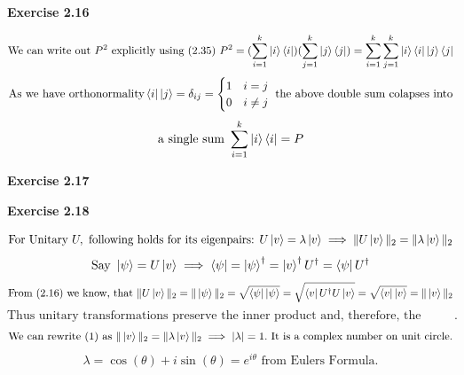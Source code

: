\documentclass{article}
\begin{document}
\bigskip

\begin{framed}
    \noindent \textbf{Exercise 2.16}
    
    \medskip
    $$
    \text{We can write out } P^2 \text{ explicitly using (2.35) } P^{2} = (\sum_{i=1}^{k}{\ket{i}\bra{i}})(\sum_{j=1}^{k}{\ket{j}\bra{j}}) = \sum_{i=1}^{k}\sum_{j=1}^{k}\ket{i}\bra{i}\ket{j}\bra{j}
    $$
    $$
    \text{As we have orthonormality} \bra{i}\ket{j} = \delta_{ij} = \begin{cases}1 & i=j \\ 0 & i \neq j\end{cases} \text{ the above double sum colapses into}
    $$
    $$
    \text{a single sum }\sum_{i=1}^{k}{\ket{i}\bra{i}} = P
    $$
    
    
\end{framed}

\bigskip

\begin{framed}
    \noindent \textbf{Exercise 2.17}
    
    \medskip
    
    
\end{framed}

\bigskip

\begin{framed}
    \noindent \textbf{Exercise 2.18}
    
    \medskip

         \begin{equation}
          \text{For Unitary } U, \text{ following holds for its eigenpairs: } U\ket{v} = \lambda \ket{v} \implies \|U\ket{v}\|_2 = \| \lambda \ket{v}\|_2
      \end{equation}
      \begin{equation}
          \text{Say } \ket{\psi} = U\ket{v} \implies \bra{\psi} = \ket{\psi}^{\dagger} = \ket{v}^{\dagger}U^{\dagger} = \bra{\psi}U^{\dagger}
      \end{equation}
      $$
      \text{From } (2.16) \text{ we know, that } \|U\ket{v}\|_2 = \|\ket{\psi}\|_2 = \sqrt{\bra{\psi}\ket{\psi}} = \sqrt{\bra{v}U^{\dagger}U\ket{v}} = \sqrt{\bra{v}\ket{v}} = \|\ket{v}\|_2
      $$
      $$
      \text{Thus unitary transformations preserve the inner product and, therefore, the Euclidean      norm of vectors}.
      $$
      $$
      \text{We can rewrite } (1) \text{ as } \|\ket{v}\|_2 = \| \lambda \ket{v} \|_2 \implies | \lambda | = 1. \text{ It is a complex number on unit circle}.
      $$
      $$
      \lambda = \cos(\theta) + i \sin(\theta) = e^{i \theta} \text{ from Eulers Formula}.
    $$

    
    
\end{framed}
\end{document}
